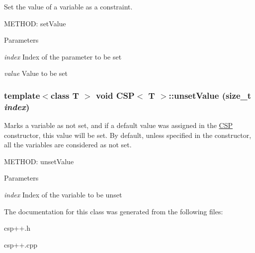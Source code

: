 Set the value of a variable as a constraint. 

METHOD: setValue 
\begin{DoxyParams}{Parameters}
\item[{\em index}]Index of the parameter to be set \item[{\em value}]Value to be set \end{DoxyParams}
\hypertarget{classCSP_a4c0cae125a610f519dc22eaec255a0ae}{
\subsubsection[{unsetValue}]{\setlength{\rightskip}{0pt plus 5cm}template$<$class T $>$ void {\bf CSP}$<$ T $>$::unsetValue (size\_\-t {\em index})}}
\label{classCSP_a4c0cae125a610f519dc22eaec255a0ae}


Marks a variable as not set, and if a default value was assigned in the \hyperlink{classCSP}{CSP} constructor, this value will be set. By default, unless specified in the constructor, all the variables are considered as not set. 

METHOD: unsetValue 
\begin{DoxyParams}{Parameters}
\item[{\em index}]Index of the variable to be unset \end{DoxyParams}


The documentation for this class was generated from the following files:\begin{DoxyCompactItemize}
\item 
csp++.h\item 
csp++.cpp\end{DoxyCompactItemize}
